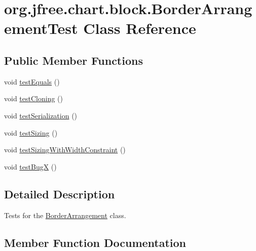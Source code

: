 \hypertarget{classorg_1_1jfree_1_1chart_1_1block_1_1_border_arrangement_test}{}\section{org.\+jfree.\+chart.\+block.\+Border\+Arrangement\+Test Class Reference}
\label{classorg_1_1jfree_1_1chart_1_1block_1_1_border_arrangement_test}
\subsection*{Public Member Functions}
\begin{DoxyCompactItemize}
\item 
void \mbox{\hyperlink{classorg_1_1jfree_1_1chart_1_1block_1_1_border_arrangement_test_a11602a59db42e312c11351a9f71e3e38}{test\+Equals}} ()
\item 
void \mbox{\hyperlink{classorg_1_1jfree_1_1chart_1_1block_1_1_border_arrangement_test_af4c4e2346fcb67282fc30003e996bc3f}{test\+Cloning}} ()
\item 
void \mbox{\hyperlink{classorg_1_1jfree_1_1chart_1_1block_1_1_border_arrangement_test_a7e660999a7232439018ebf46300cd569}{test\+Serialization}} ()
\item 
void \mbox{\hyperlink{classorg_1_1jfree_1_1chart_1_1block_1_1_border_arrangement_test_a5546f7635ae4b9aa72a53d0b02a6fdcf}{test\+Sizing}} ()
\item 
void \mbox{\hyperlink{classorg_1_1jfree_1_1chart_1_1block_1_1_border_arrangement_test_ad3f564db99f10274582323c92478c6e6}{test\+Sizing\+With\+Width\+Constraint}} ()
\item 
void \mbox{\hyperlink{classorg_1_1jfree_1_1chart_1_1block_1_1_border_arrangement_test_a5ad5dd633085d24c60fb7036ee493044}{test\+BugX}} ()
\end{DoxyCompactItemize}


\subsection{Detailed Description}
Tests for the \mbox{\hyperlink{classorg_1_1jfree_1_1chart_1_1block_1_1_border_arrangement}{Border\+Arrangement}} class. 

\subsection{Member Function Documentation}
\mbox{\label{classorg_1_1jfree_1_1chart_1_1block_1_1_border_arrangement_test_a5ad5dd633085d24c60fb7036ee493044}} 
